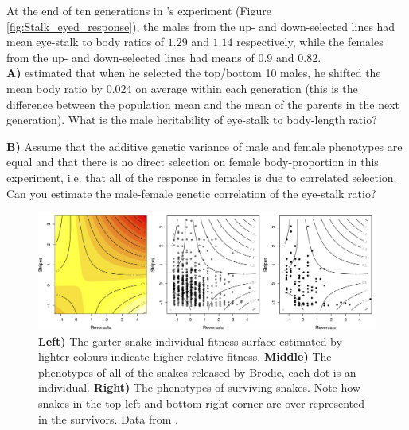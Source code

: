 \begin{question}{}

At the end of ten generations in \citeauthor{wilkinson:93}'s experiment (Figure
\ref{fig:Stalk_eyed_response}), the males from the up- and down-selected
lines had mean eye-stalk to body ratios of $1.29$ and $1.14$
respectively, while the females from the up- and down-selected lines
had means of $0.9$ and $0.82$. \\
{\bf A)} \citeauthor{wilkinson:93} estimated that when he selected the top/bottom 10 males, he shifted the mean body ratio by 0.024 on average within
	each generation (this is the difference between the population mean and the mean of the parents in the next generation). What is the male heritability of eye-stalk to body-length ratio?

{\bf B)} Assume that the additive genetic variance of male and female phenotypes are
equal and that there is no direct
selection on female body-proportion in this experiment, i.e. that all of
the response in females is due to correlated selection. Can you
estimate the male-female genetic correlation of the eye-stalk ratio? 

\end{question}

\begin{figure}
\begin{center} 
\includegraphics[width= \textwidth]{Journal_figs/Quant_gen/Garter_snakes_Brodie/Garter_snakes_Brodie.png}
\end{center}
\caption{ {\bf Left)} The garter snake individual fitness surface estimated by \citet{brodie1992correlational}
 lighter colours indicate higher
 relative fitness. {\bf Middle)} The phenotypes of all of the snakes released
   by Brodie, each dot is an individual. {\bf Right)} The phenotypes
   of surviving snakes. Note how snakes in the top left and bottom
   right corner are over represented in the survivors. Data from  \citet{brodie1992correlational}
  . } \label{fig:Garter_snakes_Brodie}
\end{figure} 

